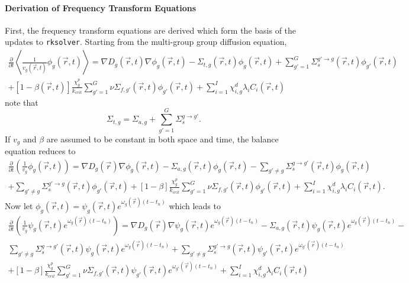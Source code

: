 \documentclass[12pt]{report}
\begin{document}
	\paragraph{Derivation of Frequency Transform Equations}
	First, the frequency transform equations are derived which form the basis of the updates to \texttt{rksolver}. Starting from the multi-group group diffusion equation,
	\begin{eqnarray}
	\frac{\partial}{\partial t} \left\langle \frac{1}{v_g(\vec{r},t)} \phi_g(\vec{r},t) \right\rangle = \nabla D_g(\vec{r},t) \nabla \phi_g(\vec{r},t) - \Sigma_{t,g}(\vec{r},t) \phi_g(\vec{r},t) + \sum_{g'=1}^{G} \Sigma_{s}^{g'\rightarrow g} (\vec{r},t) \phi_{g'}(\vec{r},t) \nonumber \\ 
	+ \left[ 1- \beta(\vec{r},t) \right] \frac{\chi_g^p}{k_{crit}} \sum_{g'=1}^{G} \nu \Sigma_{f,g'}(\vec{r},t) \phi_{g'}(\vec{r},t) + \sum_{i=1}^{I} \chi_{i,g}^d \lambda_i C_i(\vec{r},t) \nonumber
	\end{eqnarray}
	note that
	\begin{equation}
	\Sigma_{t,g} = \Sigma_{a,g} + \sum_{g'= 1}^G \Sigma_{s}^{g\rightarrow g'} \nonumber.
	\end{equation}
	If $v_g$ and $\beta$ are assumed to be constant in both space and time, the balance equation reduces to
	\begin{eqnarray}
	\frac{\partial}{\partial t} \left( \frac{1}{v_g} \phi_g(\vec{r},t) \right) = \nabla D_g(\vec{r}) \nabla \phi_g(\vec{r},t)  - \Sigma_{a,g}(\vec{r},t) \phi_g(\vec{r},t) - \sum_{g'\neq g} \Sigma_{s}^{g\rightarrow g'} (\vec{r},t) \phi_{g}(\vec{r},t)  \nonumber \\  + \sum_{g' \neq g} \Sigma_{s}^{g'\rightarrow g} (\vec{r},t) \phi_{g'}(\vec{r},t)
	+ \left[ 1- \beta \right] \frac{\chi_g^p}{k_{crit}} \sum_{g'=1}^{G} \nu \Sigma_{f,g'}(\vec{r},t) \phi_{g'}(\vec{r},t) + \sum_{i=1}^{I} \chi_{i,g}^d \lambda_i C_i(\vec{r},t) \nonumber.
	\end{eqnarray}
	Now let $\phi_g(\vec{r},t) = \psi_g(\vec{r},t) e^{\omega_g(\vec{r}) (t-t_n)}$ which leads to
	\begin{eqnarray}
	\frac{\partial}{\partial t} \left( \frac{1}{v_g} \psi_g(\vec{r},t) e^{\omega_g(\vec{r}) (t-t_n)} \right) = \nabla D_g(\vec{r}) \nabla \psi_g(\vec{r},t) e^{\omega_g(\vec{r}) (t-t_n)}  - \Sigma_{a,g}(\vec{r},t) \psi_g(\vec{r},t) e^{\omega_g(\vec{r}) (t-t_n)} - \nonumber \\ \sum_{g'\neq g} \Sigma_{s}^{g\rightarrow g'} (\vec{r},t) \psi_g(\vec{r},t) e^{\omega_g(\vec{r}) (t-t_n)}    + \sum_{g' \neq g} \Sigma_{s}^{g'\rightarrow g} (\vec{r},t) \psi_{g'}(\vec{r},t) e^{\omega_{g'}(\vec{r}) (t-t_n)} \nonumber \\
	+ \left[ 1- \beta \right] \frac{\chi_g^p}{k_{crit}} \sum_{g'=1}^{G} \nu \Sigma_{f,g'}(\vec{r},t) \psi_{g'}(\vec{r},t) e^{\omega_{g'}(\vec{r}) (t-t_n)} + \sum_{i=1}^{I} \chi_{i,g}^d \lambda_i C_i(\vec{r},t) \nonumber
	\end{eqnarray}
\end{document}
